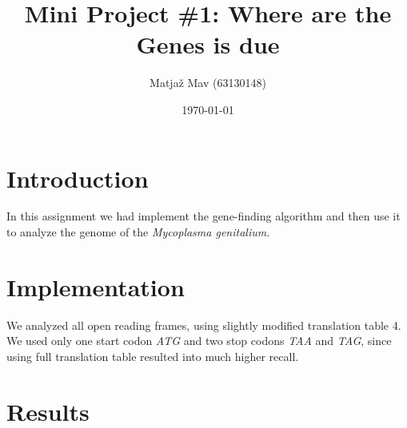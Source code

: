 \documentclass[a4paper,11pt]{article}
\title{Mini Project \#1: Where are the Genes is due}
\author{Matjaž Mav (63130148)}
\date{\today}
\begin{document}
\maketitle

\section{Introduction}

In this assignment we had implement the gene-finding algorithm and then use it to analyze the genome of the \textit{Mycoplasma genitalium}.

\section{Implementation}
We analyzed all open reading frames, using slightly modified translation table 4. We used only one start codon \textit{ATG} and two stop codons \textit{TAA} and \textit{TAG}, since using full translation table resulted into much higher recall.

\section{Results}
\end{document}
